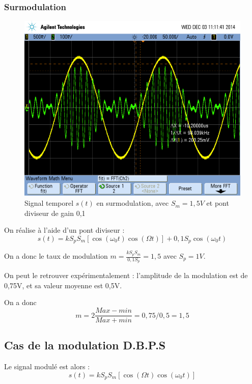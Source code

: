 \documentclass[../../Cours_M1.tex]{subfiles}
\begin{document}
\subsubsection*{Surmodulation}
\begin{figure}[h!]
\centering
\includegraphics[scale=0.2]{Surmod.png}
\caption{Signal temporel $s(t)$ en surmodulation, avec $S_m=1,5V$ et pont diviseur de gain 0,1}
\end{figure}

On réalise à l'aide d'un pont diviseur :
\[s(t) = kS_pS_m[\cos(\omega_0 t)\cos(\Omega t)]+0,1S_p\cos(\omega_0 t)\]

On a donc le taux de modulation $m=\frac{kS_pS_m}{0,1S_p}=1,5$ avec $S_p=1V$.

On peut le retrouver expérimentalement : l'amplitude de la modulation est de 0,75V, et sa valeur moyenne est 0,5V.

On a donc \[m= 2\frac{Max-min}{Max+min}=0,75/0,5 = 1,5\]

\newpage
\subsection{Cas de la modulation D.B.P.S}

Le signal modulé est alors :
\[s(t)=kS_pS_m[\cos(\Omega t)\cos(\omega_0 t)]\]
\end{document}
